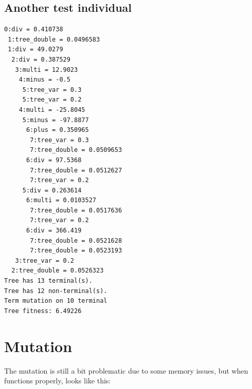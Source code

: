 \documentclass[12pt]{article}
\begin{document}
\subsection{Another test individual}
\begin{lstlisting}
0:div = 0.410738
 1:tree_double = 0.0496583
 1:div = 49.0279
  2:div = 0.387529
   3:multi = 12.9023
    4:minus = -0.5
     5:tree_var = 0.3
     5:tree_var = 0.2
    4:multi = -25.8045
     5:minus = -97.8877
      6:plus = 0.350965
       7:tree_var = 0.3
       7:tree_double = 0.0509653
      6:div = 97.5368
       7:tree_double = 0.0512627
       7:tree_var = 0.2
     5:div = 0.263614
      6:multi = 0.0103527
       7:tree_double = 0.0517636
       7:tree_var = 0.2
      6:div = 366.419
       7:tree_double = 0.0521628
       7:tree_double = 0.0523193
   3:tree_var = 0.2
  2:tree_double = 0.0526323
Tree has 13 terminal(s).
Tree has 12 non-terminal(s).
Term mutation on 10 terminal
Tree fitness: 6.49226
\end{lstlisting}

\pagebreak

\section{Mutation}
The mutation is still a bit problematic due to some memory issues, but when functions properly, looks like this:
\end{document}
